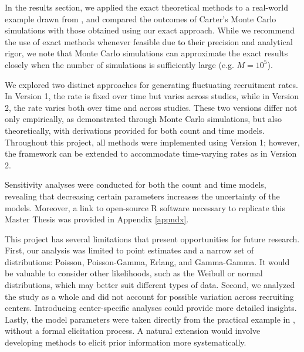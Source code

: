 In the results section, we applied the exact theoretical methods to a real-world example drawn from \cite{carter2004application}, and compared the outcomes of Carter's Monte Carlo simulations with those obtained using our exact approach. While we recommend the use of exact methods whenever feasible due to their precision and analytical rigor, we note that Monte Carlo simulations can approximate the exact results closely when the number of simulations is sufficiently large (e.g. $M=10^5$).

We explored two distinct approaches for generating fluctuating recruitment rates. In Version 1, the rate is fixed over time but varies across studies, while in Version 2, the rate varies both over time and across studies. These two versions differ not only empirically, as demonstrated through Monte Carlo simulations, but also theoretically, with derivations provided for both count and time models. Throughout this project, all methods were implemented using Version 1; however, the framework can be extended to accommodate time-varying rates as in Version 2. 

Sensitivity analyses were conducted for both the count and time models, revealing that decreasing certain parameters increases the uncertainty of the models. Moreover, a link to open-source R software necessary to replicate this Master Thesis was provided in Appendix \ref{appndx}.

This project has several limitations that present opportunities for future research. First, our analysis was limited to point estimates and a narrow set of distributions: Poisson, Poisson-Gamma, Erlang, and Gamma-Gamma. It would be valuable to consider other likelihoods, such as the Weibull or normal distributions, which may better suit different types of data. Second, we analyzed the study as a whole and did not account for possible variation across recruiting centers. Introducing center-specific analyses could provide more detailed insights. Lastly, the model parameters were taken directly from the practical example in \cite{carter2004application}, without a formal elicitation process. A natural extension would involve developing methods to elicit prior information more systematically.


